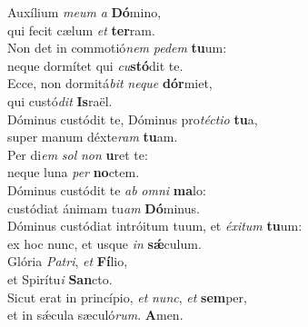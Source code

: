 \evenverse Auxílium \textit{me}\textit{um} \textit{a} \textbf{Dó}mino,~\*\\
\evenverse qui fecit cælum \textit{et} \textbf{ter}ram.\\
\oddverse Non det in commotió\textit{nem} \textit{pe}\textit{dem} \textbf{tu}um:~\*\\
\oddverse neque dormítet qui \textit{cu}\textbf{stó}dit te.\\
\evenverse Ecce, non dormitá\textit{bit} \textit{ne}\textit{que} \textbf{dór}miet,~\*\\
\evenverse qui custó\textit{dit} \textbf{Is}raël.\\
\oddverse Dóminus custódit te, Dóminus pro\textit{té}\textit{cti}\textit{o} \textbf{tu}a,~\*\\
\oddverse super manum déxte\textit{ram} \textbf{tu}am.\\
\evenverse Per di\textit{em} \textit{sol} \textit{non} \textbf{u}ret te:~\*\\
\evenverse neque luna \textit{per} \textbf{no}ctem.\\
\oddverse Dóminus custódit te \textit{ab} \textit{om}\textit{ni} \textbf{ma}lo:~\*\\
\oddverse custódiat ánimam tu\textit{am} \textbf{Dó}minus.\\
\evenverse Dóminus custódiat intróitum tuum, et \textit{é}\textit{xi}\textit{tum} \textbf{tu}um:~\*\\
\evenverse ex hoc nunc, et usque \textit{in} \textbf{sǽ}culum.\\
\oddverse Glória \textit{Pa}\textit{tri}, \textit{et} \textbf{Fí}lio,~\*\\
\oddverse et Spirítu\textit{i} \textbf{San}cto.\\
\evenverse Sicut erat in princípio, \textit{et} \textit{nunc}, \textit{et} \textbf{sem}per,~\*\\
\evenverse et in sǽcula sæculó\textit{rum}. \textbf{A}men.\\
